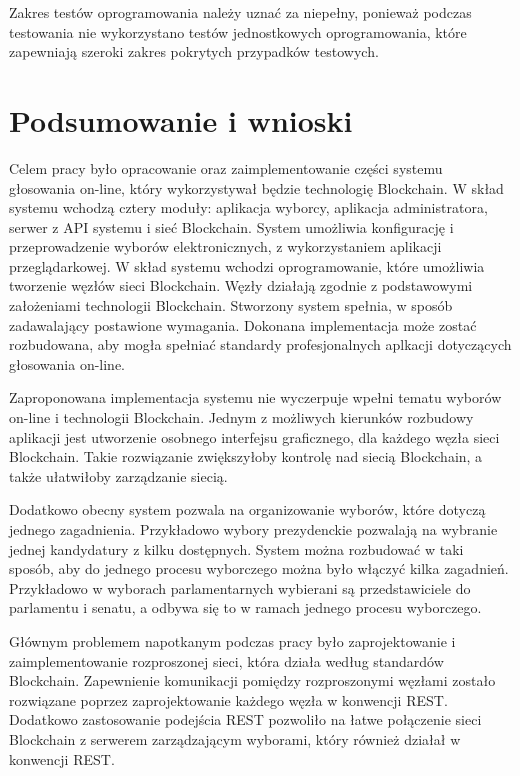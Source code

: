 \documentclass[a4paper,12pt]{book}
\begin{document}
Zakres testów oprogramowania należy uznać za niepełny, ponieważ podczas testowania nie wykorzystano testów jednostkowych oprogramowania, które zapewniają szeroki zakres pokrytych przypadków testowych.

\chapter{Podsumowanie i wnioski}

Celem pracy było opracowanie oraz zaimplementowanie części systemu głosowania on-line, który wykorzystywał będzie technologię Blockchain. W skład systemu wchodzą cztery moduły: aplikacja wyborcy, aplikacja administratora, serwer z API systemu i sieć Blockchain. System umożliwia konfigurację  i przeprowadzenie wyborów elektronicznych, z wykorzystaniem aplikacji przeglądarkowej. W skład systemu wchodzi oprogramowanie, które umożliwia tworzenie węzłów sieci Blockchain. Węzły działają zgodnie z podstawowymi założeniami technologii Blockchain.
Stworzony system spełnia, w sposób zadawalający postawione wymagania. Dokonana implementacja może zostać rozbudowana, aby mogła spełniać standardy profesjonalnych aplkacji dotyczących głosowania on-line.

Zaproponowana implementacja systemu nie wyczerpuje wpełni tematu wyborów on-line i technologii Blockchain. Jednym z możliwych kierunków rozbudowy aplikacji jest utworzenie osobnego interfejsu graficznego, dla każdego węzła sieci Blockchain. Takie rozwiązanie zwiększyłoby kontrolę nad siecią Blockchain, a także ułatwiłoby zarządzanie siecią.

Dodatkowo obecny system pozwala na organizowanie wyborów, które dotyczą jednego zagadnienia. Przykładowo wybory prezydenckie pozwalają na wybranie jednej kandydatury z kilku dostępnych. System można rozbudować w taki sposób, aby do jednego procesu wyborczego można było włączyć kilka zagadnień. Przykładowo w wyborach parlamentarnych wybierani są przedstawiciele do parlamentu i senatu, a odbywa się to w ramach jednego procesu wyborczego.

Głównym problemem napotkanym podczas pracy było zaprojektowanie i zaimplementowanie rozproszonej sieci, która działa według standardów Blockchain. Zapewnienie komunikacji pomiędzy rozproszonymi węzłami zostało rozwiązane poprzez zaprojektowanie każdego węzła w konwencji REST. Dodatkowo zastosowanie podejścia REST pozwoliło na łatwe połączenie sieci Blockchain z serwerem zarządzającym wyborami, który również działał w konwencji REST.
\end{document}
